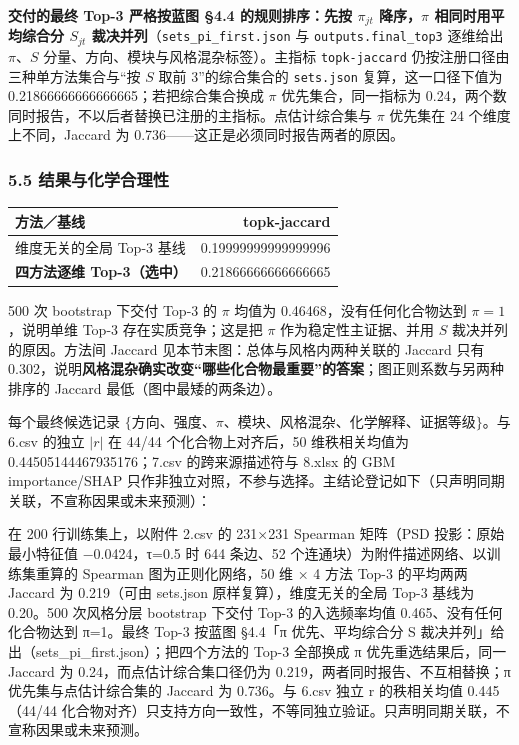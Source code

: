 \documentclass[
  11pt,
]{article}
\newcounter{none} %
\begin{document}
\textbf{交付的最终 Top-3 严格按蓝图 §4.4 的规则排序：先按 \(\pi_{jt}\)
降序，\(\pi\) 相同时用平均综合分 \(S_{jt}\)
裁决并列}（\texttt{sets\_pi\_first.json} 与 \texttt{outputs.final\_top3}
逐维给出 \(\pi\)、\(S\) 分量、方向、模块与风格混杂标签）。主指标
\texttt{topk-jaccard} 仍按注册口径由三种单方法集合与``按 \(S\) 取前
3''的综合集合的 \texttt{sets.json} 复算，这一口径下值为
0.21866666666666665；若把综合集合换成 \(\pi\) 优先集合，同一指标为
0.24，两个数同时报告，不以后者替换已注册的主指标。点估计综合集与 \(\pi\)
优先集在 24 个维度上不同，Jaccard 为
0.736------这正是必须同时报告两者的原因。

\subsubsection{5.5
结果与化学合理性}\label{ux7ed3ux679cux4e0eux5316ux5b66ux5408ux7406ux6027}

{\def\LTcaptype{none} %
\begin{longtable}[]{@{}lr@{}}
\toprule\noalign{}
方法／基线 & topk-jaccard \\
\midrule\noalign{}
\endhead
\bottomrule\noalign{}
\endlastfoot
维度无关的全局 Top-3 基线 & 0.19999999999999996 \\
\textbf{四方法逐维 Top-3（选中）} & 0.21866666666666665 \\
\end{longtable}
}

500 次 bootstrap 下交付 Top-3 的 \(\pi\) 均值为
0.46468，没有任何化合物达到 \(\pi=1\)，说明单维 Top-3
存在实质竞争；这是把 \(\pi\) 作为稳定性主证据、并用 \(S\)
裁决并列的原因。方法间 Jaccard 见本节末图：总体与风格内两种关联的
Jaccard 只有
0.302，说明\textbf{风格混杂确实改变``哪些化合物最重要''的答案}；图正则系数与另两种排序的
Jaccard 最低（图中最矮的两条边）。

每个最终候选记录
\(\{\)方向、强度、\(\pi\)、模块、风格混杂、化学解释、证据等级\(\}\)。与
6.csv 的独立 \(|r|\) 在 44/44 个化合物上对齐后，50 维秩相关均值为
0.44505144467935176；7.csv 的跨来源描述符与 8.xlsx 的 GBM
importance/SHAP
只作非独立对照，不参与选择。主结论登记如下（只声明同期关联，不宣称因果或未来预测）：

在 200 行训练集上，以附件 2.csv 的 231×231 Spearman 矩阵（PSD
投影：原始最小特征值 −0.0424，τ=0.5 时 644 条边、52
个连通块）为附件描述网络、以训练集重算的 Spearman 图为正则化网络，50 维
× 4 方法 Top-3 的平均两两 Jaccard 为 0.219（可由 sets.json
原样复算），维度无关的全局 Top-3 基线为 0.20。500 次风格分层 bootstrap
下交付 Top-3 的入选频率均值 0.465、没有任何化合物达到 π=1。最终 Top-3
按蓝图 §4.4「π 优先、平均综合分 S
裁决并列」给出（sets\_pi\_first.json）；把四个方法的 Top-3 全部换成 π
优先重选结果后，同一 Jaccard 为 0.24，而点估计综合集口径仍为
0.219，两者同时报告、不互相替换；π 优先集与点估计综合集的 Jaccard 为
0.736。与 6.csv 独立 \textbar r\textbar{} 的秩相关均值 0.445（44/44
化合物对齐）只支持方向一致性，不等同独立验证。只声明同期关联，不宣称因果或未来预测。
\end{document}
